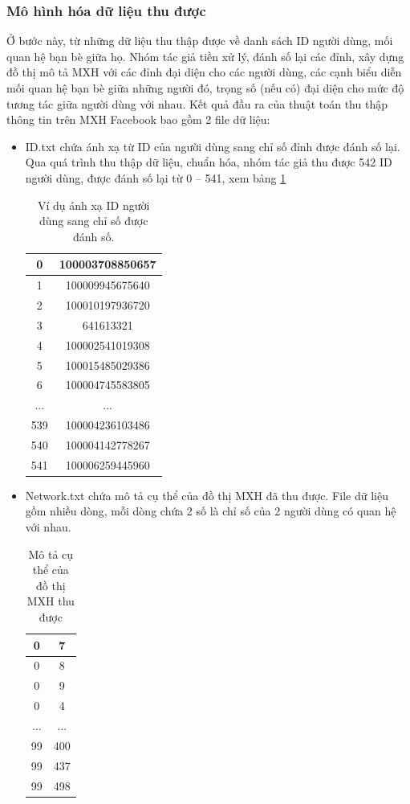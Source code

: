 \subsubsection{Mô hình hóa dữ liệu thu được}
Ở bước này, từ những dữ liệu thu thập được về danh sách ID người dùng, mối quan hệ bạn bè giữa họ. Nhóm tác giả tiền xử lý, đánh số lại các đỉnh, xây dựng đồ thị mô tả MXH với các đỉnh đại diện cho các người dùng, các cạnh biểu diễn mối quan hệ bạn bè giữa những người đó, trọng số (nếu có) đại diện cho mức độ tương tác giữa người dùng với nhau. Kết quả đầu ra của thuật toán thu thập thông tin trên MXH Facebook bao gồm 2 file dữ liệu:
\begin {itemize}
\item ID.txt chứa ánh xạ từ ID của người dùng sang chỉ số đỉnh được đánh số lại. Qua quá trình thu thập dữ liệu, chuẩn hóa, nhóm tác giả thu được 542 ID người dùng, được đánh số lại từ 0 – 541, xem bảng \ref{bang3_1}		
\begin{table} [!htp]
	\centering 
	\begin{tabular}{|c|c|}
		\hline 
		0 & 100003708850657 \\ 
		\hline 
		1 & 100009945675640 \\ 
		\hline 
		2 & 100010197936720 \\ 
		\hline 
		3 & 641613321 \\ 
		\hline 
		4 & 100002541019308 \\ 
		\hline 
		5 & 100015485029386 \\ 
		\hline 
		6 & 100004745583805 \\ 
		\hline 
		... & ... \\ 
		\hline 
		539 & 100004236103486 \\ 
		\hline 
		540 & 100004142778267 \\ 
		\hline 
		541 & 100006259445960 \\ 
		\hline 
	\end{tabular} 
	\caption{Ví dụ ánh xạ ID người dùng sang chỉ số được đánh số.}
	\label{bang3_1}
\end{table}
\item Network.txt chứa mô tả cụ thể của đồ thị MXH đã thu được. File dữ liệu gồm nhiều dòng, mỗi dòng chứa 2 số là chỉ số của 2 người dùng có quan hệ với nhau.

\begin{table} [!htp]
	\centering
	\begin{tabular}{|c|c|}
		\hline 
		0 & 7 \\ 
		\hline 
		0 & 8 \\ 
		\hline 
		0 & 9 \\ 
		\hline 
		0 & 4 \\ 
		\hline 
		... & ... \\ 
		\hline 
		99 & 400 \\ 
		\hline 
		99 & 437 \\ 
		\hline 
		99 & 498 \\ 
		\hline 
	\end{tabular}
	\caption{Mô tả cụ thể của đồ thị MXH thu được}
	\label{bang3_2} 
\end{table}


\end{itemize}
